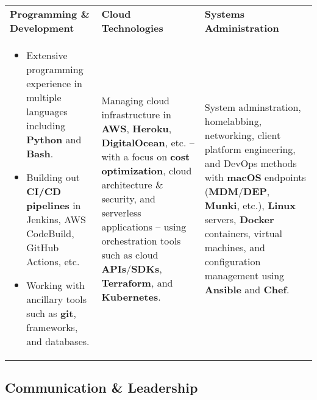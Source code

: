 \documentclass[10pt]{article}
\newcommand{\afterlistspace}[0]{\vspace{-1.5em}}
\begin{document}
\begin{tabularx}{\linewidth}{
    >{\hsize=1\hsize}X|%
    >{\hsize=1\hsize}X|%
    >{\hsize=1\hsize}X%
  }
    \textbf{Programming \& Development}
    & \textbf{Cloud Technologies}
    & \textbf{Systems Administration}
    \\
    \begin{itemize}
        \vspace{-0.67em}

        \item Extensive programming experience in multiple languages including \textbf{Python} and \textbf{Bash}.

        \item Building out \textbf{CI/CD pipelines} in Jenkins, AWS CodeBuild, GitHub Actions, etc.

        \item Working with ancillary tools such as \textbf{git}, frameworks, and databases.
        
        \afterlistspace
    \end{itemize}

    & Managing cloud infrastructure in \textbf{AWS}, \textbf{Heroku}, \textbf{DigitalOcean}, etc. -- with a focus on \textbf{cost optimization}, cloud architecture \& security, and serverless applications -- using orchestration tools such as cloud \textbf{APIs}/\textbf{SDKs}, \textbf{Terraform}, and \textbf{Kubernetes}.

    & System adminstration, homelabbing, networking, client platform engineering, and DevOps methods with \textbf{macOS} endpoints (\textbf{MDM}/\textbf{DEP}, \textbf{Munki}, etc.), \textbf{Linux} servers, \textbf{Docker} containers, virtual machines, and configuration management using \textbf{Ansible} and \textbf{Chef}.
    
\end{tabularx}


\subsection{Communication \& Leadership}
\end{document}
